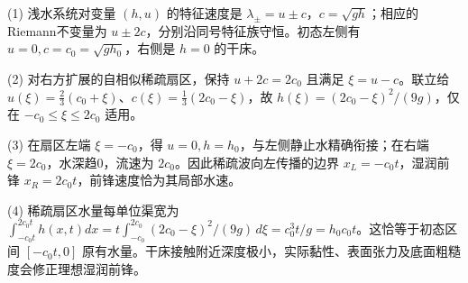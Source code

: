 (1) 浅水系统对变量 \((h,u)\) 的特征速度是 \(\lambda_\pm=u\pm c\)，\(c=\sqrt{gh}\)；相应的Riemann不变量为 \(u\pm2c\)，分别沿同号特征族守恒。初态左侧有 \(u=0,c=c_0=\sqrt{gh_0}\)，右侧是 \(h=0\) 的干床。

(2) 对右方扩展的自相似稀疏扇区，保持 \(u+2c=2c_0\) 且满足 \(\xi=u-c\)。联立给 \(\boxed{u(\xi)=\frac23(c_0+\xi)}\)、\(\boxed{c(\xi)=\frac13(2c_0-\xi)}\)，故 \(\boxed{h(\xi)=(2c_0-\xi)^2/(9g)}\)，仅在 \(-c_0\le\xi\le2c_0\) 适用。

(3) 在扇区左端 \(\xi=-c_0\)，得 \(u=0,h=h_0\)，与左侧静止水精确衔接；在右端 \(\xi=2c_0\)，水深趋0，流速为 \(2c_0\)。因此稀疏波向左传播的边界 \(x_L=-c_0t\)，湿润前锋 \(x_R=2c_0t\)，前锋速度恰为其局部水速。

(4) 稀疏扇区水量每单位渠宽为 \(\int_{-c_0t}^{2c_0t}h(x,t)dx=t\int_{-c_0}^{2c_0}(2c_0-\xi)^2/(9g)\,d\xi=c_0^3t/g=h_0c_0t\)。这恰等于初态区间 \([-c_0t,0]\) 原有水量。干床接触附近深度极小，实际黏性、表面张力及底面粗糙度会修正理想湿润前锋。
